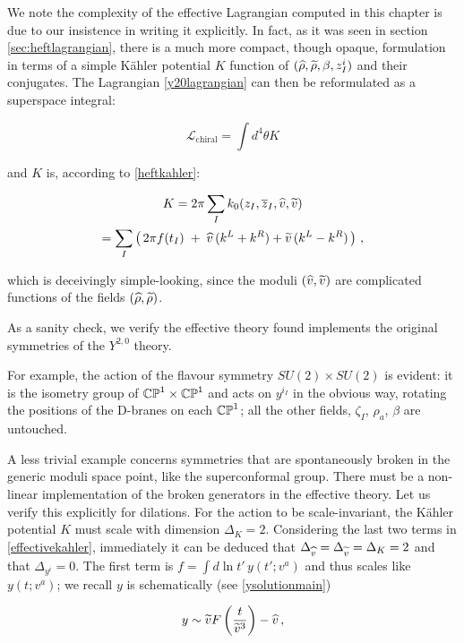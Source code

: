 We note the complexity of the effective Lagrangian computed in this chapter is due to our insistence in writing it explicitly. In fact, as it was seen in section \ref{sec:heftlagrangian}, there is a much more compact, though opaque, formulation in terms of a simple K\"ahler potential $K$ function of $(\widehat{\rho},\widetilde{\rho},\beta,z_I^i)$ and their conjugates. The Lagrangian \eqref{y20lagrangian} can then be reformulated as a superspace integral:

\begin{equation}
	\mathcal{L}_\mathrm{chiral} = \int d^4 \theta K
	\label{}
\end{equation}

and $K$ is, according to \eqref{heftkahler}:

\begin{gather}
	K = 2\pi \sum_I k_0(z_I, \overline{z}_I,\widehat{v}, \widetilde{v}) \\
	= \sum_I \left(\, 2\pi f(t_I) \;+\; \widehat{v}\, (k^L + k^R) + \widetilde{v}\,(k^L - k^R)\, \right)\,,
	\label{effectivekahler}
\end{gather}

which is deceivingly simple-looking, since the moduli $(\widehat{v},\widetilde{v})$ are complicated functions of the fields $(\widehat{\rho},\widetilde{\rho})$.

As a sanity check, we verify the effective theory found implements the original symmetries of the $Y^{2,0}$ theory. 

For example, the action of the flavour symmetry $SU(2) \times SU(2)$ is evident: it is the isometry group of $\mathbb{CP}^1 \times \mathbb{CP}^1$ and acts on $y^{i_I}$ in the obvious way, rotating the positions of the D-branes on each $\mathbb{CP}^1$; all the other fields, $\zeta_I$, $\rho_a$, $\beta$ are untouched.

A less trivial example concerns symmetries that are spontaneously broken in the generic moduli space point, like the superconformal group. There must be a non-linear implementation of the broken generators in the effective theory. Let us verify this explicitly for dilations. For the action to be scale-invariant, the K\"ahler potential $K$ must scale with dimension $\Delta_K = 2$. Considering the last two terms in \eqref{effectivekahler}, immediately it can be deduced that $\Delta_{\widehat{v}} = \Delta_{\widetilde{v}} = \Delta_K = 2$ and that $\Delta_{y^i}=0$. The first term is $f = \int d\ln t' \, y(t';v^a)$ and thus scales like $y(t;v^a)$; we recall $y$ is schematically (see \eqref{ysolutionmain})

\begin{equation}
	y \sim \widetilde{v} F\left( \frac{t}{{\widetilde{v}}^3} \right) - \widehat{v}\,,
	\label{}
\end{equation}

